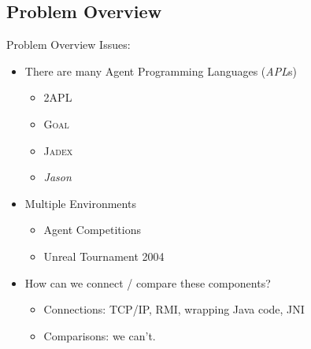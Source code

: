 \documentclass[t]{beamer}
\begin{document}
\subsection{Problem Overview}
\begin{frame}{Problem Overview}
	Issues:
	\begin{itemize}
		\item There are many Agent Programming Languages (\emph{APL}s)
		\begin{itemize}
			\item 2APL
			\item \textsc{Goal}
			\item \textsc{Jadex}
			\item \textit{Jason}
		\end{itemize}
		\item Multiple Environments
		\begin{itemize}
			\item Agent Competitions
			\item Unreal Tournament 2004
		\end{itemize}
		\item How can we connect / compare these components?
		\begin{itemize}
			\item Connections: TCP/IP, RMI, wrapping Java code, JNI
			\item Comparisons: we can't.
		\end{itemize}
	\end{itemize}
\end{frame}
\end{document}
